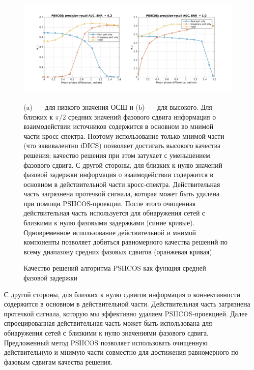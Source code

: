\begin{figure}[!ht]
 \includegraphics[width=1\textwidth]{../images/psiicos_paper/Figure9_hr.jpg}
 \caption{Качество решений алгоритма PSIICOS как функция средней фазовой задержки}\label{fig:09}
     (a)~--- для низкого значения ОСШ и (b)~--- для высокого.
     Для близких к $\pi/2$ средних значений фазового сдвига информация
     о взаимодействии источников содержится в основном во мнимой части кросс-спектра.
     Поэтому использование только мнимой части (что эквивалентно iDICS) позволяет
     достигать высокого качества решения; качество решения при этом затухает
     с уменьшением фазового сдвига. С другой стороны, для близких к нулю
     значений фазовой задержки информация о взаимодействии содержится в основном
     в действительной части кросс-спектра. Действительная часть загрязнена
     протечкой сигнала, которая может быть удалена при помощи PSIICOS-проекции.
     После этого очищенная действительная часть используется для обнаружения
     сетей с близкими к нулю фазовыми задержками (синие кривые). Одновременное
     использование действительной и мнимой компоненты позволяет добиться равномерного
     качества решений по всему диапазону средних фазовых сдвигов (оранжевая кривая).
\end{figure}%

С другой стороны, для близких к нулю сдвигов информация о коннективности содержится
в основном в действительной части. Действительная часть загрязнена протечкой сигнала, которую
мы эффективно удаляем PSIICOS-проекцией. Далее спроецированная действительная часть
может быть использована для обнаружения сетей с близкими к нулю значениями фазового
сдвига. Предложенный метод PSIICOS позволяет использовать очищенную действительную
и мнимую части совместно для достижения равномерного по фазовым сдвигам качества решения.

